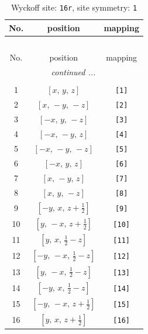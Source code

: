 \documentclass[fleqn,8pt]{jsarticle}
\begin{document}
\begin{longtable}{ccc}
\caption{Wyckoff site: {\tt 16r}, site symmetry: {\tt 1}}
 \\
 \hline \hline
No. & position & mapping \\ \hline \endfirsthead

\multicolumn{2}{l}{\tablename\ \thetable{}} \\
 \hline \hline
No. & position & mapping \\ \hline \endhead

 \hline \hline
\multicolumn{2}{r}{\footnotesize\it continued ...} \\ \endfoot

 \hline \hline
\multicolumn{2}{r}{} \\ \endlastfoot

1 & $\left[ x,\, y,\, z \right]$ & {\tt [1]} \\ \hline
2 & $\left[ x,\, - y,\, - z \right]$ & {\tt [2]} \\ \hline
3 & $\left[ - x,\, y,\, - z \right]$ & {\tt [3]} \\ \hline
4 & $\left[ - x,\, - y,\, z \right]$ & {\tt [4]} \\ \hline
5 & $\left[ - x,\, - y,\, - z \right]$ & {\tt [5]} \\ \hline
6 & $\left[ - x,\, y,\, z \right]$ & {\tt [6]} \\ \hline
7 & $\left[ x,\, - y,\, z \right]$ & {\tt [7]} \\ \hline
8 & $\left[ x,\, y,\, - z \right]$ & {\tt [8]} \\ \hline
9 & $\left[ - y,\, x,\, z + \frac{1}{2} \right]$ & {\tt [9]} \\ \hline
10 & $\left[ y,\, - x,\, z + \frac{1}{2} \right]$ & {\tt [10]} \\ \hline
11 & $\left[ y,\, x,\, \frac{1}{2} - z \right]$ & {\tt [11]} \\ \hline
12 & $\left[ - y,\, - x,\, \frac{1}{2} - z \right]$ & {\tt [12]} \\ \hline
13 & $\left[ y,\, - x,\, \frac{1}{2} - z \right]$ & {\tt [13]} \\ \hline
14 & $\left[ - y,\, x,\, \frac{1}{2} - z \right]$ & {\tt [14]} \\ \hline
15 & $\left[ - y,\, - x,\, z + \frac{1}{2} \right]$ & {\tt [15]} \\ \hline
16 & $\left[ y,\, x,\, z + \frac{1}{2} \right]$ & {\tt [16]} \\
\end{longtable}
\end{document}
